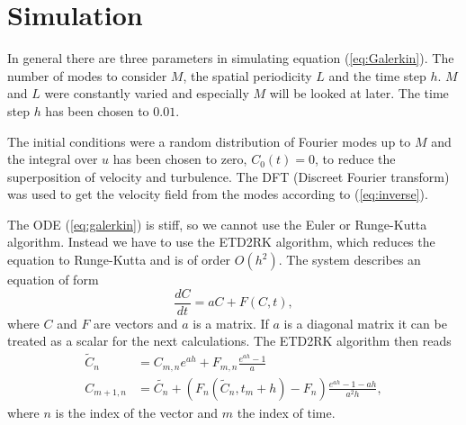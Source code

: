\section{Simulation}
In general there are three parameters in simulating equation (\ref{eq:Galerkin}). The number of modes to consider $M$, the spatial periodicity $L$ and the time step $h$. $M$ and $L$ were constantly varied and especially $M$ will be looked at later. The time step $h$ has been chosen to $0.01$.

The initial conditions were a random distribution of Fourier modes up to $M$ and the integral over $u$ has been chosen to zero, $C_0(t) = 0$, to reduce the superposition of velocity and turbulence. The DFT (Discreet Fourier transform) was used to get the velocity field from the modes according to (\ref{eq:inverse}).

The ODE (\ref{eq:galerkin}) is stiff, so we cannot use the Euler or Runge-Kutta algorithm. Instead we have to use the ETD2RK algorithm, which reduces the equation to Runge-Kutta and is of order $O(h^2)$. The system describes an equation of form
\begin{equation}
  \frac{d C}{dt} = aC + F(C,t),
\end{equation}
where $C$ and $F$ are vectors and $a$ is a matrix. If $a$ is a diagonal matrix it can be treated as a scalar for the next calculations. The ETD2RK algorithm then reads
\begin{align}
  \tilde{C}_n & = C_{m,n} e^{ah} + F_{m,n} \frac{e^{ah} - 1}{a} \\
  C_{m + 1,n} & = \tilde{C_n} + \left(F_n(\tilde{C}_n, t_m + h) - F_n \right) \frac{e^{ah} - 1 - ah}{a^2 h},
\end{align}
where $n$ is the index of the vector and $m$ the index of time.
